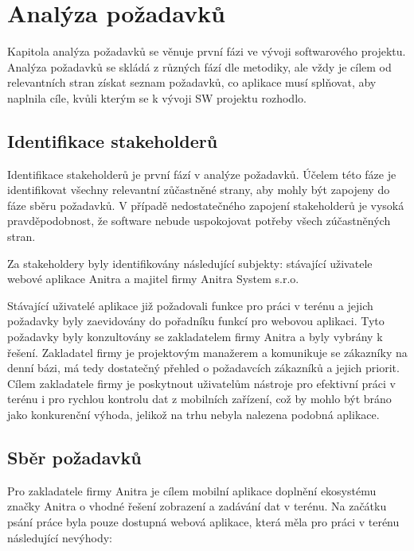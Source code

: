 
\chapter{Analýza požadavků}

Kapitola analýza požadavků se věnuje první fázi ve vývoji softwarového projektu. Analýza požadavků se skládá z různých fází dle metodiky, ale vždy je cílem od relevantních stran získat seznam požadavků, co aplikace musí splňovat, aby naplnila cíle, kvůli kterým se k vývoji SW projektu rozhodlo.


\section{Identifikace stakeholderů}


Identifikace stakeholderů je první fází v analýze požadavků. Účelem této fáze je identifikovat všechny relevantní zůčastněné strany, aby mohly být zapojeny do fáze sběru požadavků. V případě nedostatečného zapojení stakeholderů je vysoká pravděpodobnost, že software nebude uspokojovat potřeby všech zúčastněných stran.

Za stakeholdery byly identifikovány následující subjekty: stávající uživatele webové aplikace Anitra a majitel firmy Anitra System s.r.o. 

Stávající uživatelé aplikace již požadovali funkce pro práci v terénu a jejich požadavky byly zaevidovány do pořadníku funkcí pro webovou aplikaci. Tyto požadavky byly konzultovány se zakladatelem firmy Anitra a byly vybrány k řešení. Zakladatel firmy je projektovým manažerem a komunikuje se zákazníky na denní bázi, má tedy dostatečný přehled o požadavcích zákazníků a jejich priorit. Cílem zakladatele firmy je poskytnout uživatelům nástroje pro efektivní práci v terénu i pro rychlou kontrolu dat z mobilních zařízení, což by mohlo být bráno jako konkurenční výhoda, jelikož na trhu nebyla nalezena podobná aplikace.

\section{Sběr požadavků}

Pro zakladatele firmy Anitra je cílem mobilní aplikace doplnění ekosystému značky Anitra o vhodné řešení zobrazení a zadávání dat v terénu. Na začátku psání práce byla pouze dostupná webová aplikace, která měla pro práci v terénu následující nevýhody:

